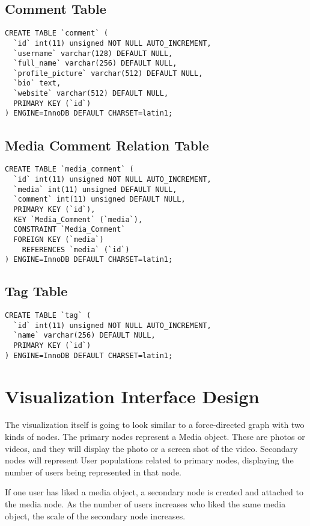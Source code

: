 \documentclass[journal]{vgtc}                %
\begin{document}
\subsection{Comment Table}
\begin{verbatim}
CREATE TABLE `comment` (
  `id` int(11) unsigned NOT NULL AUTO_INCREMENT,
  `username` varchar(128) DEFAULT NULL,
  `full_name` varchar(256) DEFAULT NULL,
  `profile_picture` varchar(512) DEFAULT NULL,
  `bio` text,
  `website` varchar(512) DEFAULT NULL,
  PRIMARY KEY (`id`)
) ENGINE=InnoDB DEFAULT CHARSET=latin1;
\end{verbatim}

\subsection{Media Comment Relation Table}
\begin{verbatim}
CREATE TABLE `media_comment` (
  `id` int(11) unsigned NOT NULL AUTO_INCREMENT,
  `media` int(11) unsigned DEFAULT NULL,
  `comment` int(11) unsigned DEFAULT NULL,
  PRIMARY KEY (`id`),
  KEY `Media_Comment` (`media`),
  CONSTRAINT `Media_Comment` 
  FOREIGN KEY (`media`) 
  	REFERENCES `media` (`id`)
) ENGINE=InnoDB DEFAULT CHARSET=latin1;
\end{verbatim}

\subsection{Tag Table}
\begin{verbatim}
CREATE TABLE `tag` (
  `id` int(11) unsigned NOT NULL AUTO_INCREMENT,
  `name` varchar(256) DEFAULT NULL,
  PRIMARY KEY (`id`)
) ENGINE=InnoDB DEFAULT CHARSET=latin1;
\end{verbatim}

\section{Visualization Interface Design}
The visualization itself is going to look similar to a force-directed graph with two kinds of nodes. The primary nodes represent a Media object. These are photos or videos, and they will display the photo or a screen shot of the video. Secondary nodes will represent User populations related to primary nodes, displaying the number of users being represented in that node.

If one user has liked a media object, a secondary node is created and attached to the media node. As the number of users increases who liked the same media object, the scale of the secondary node increases.
\end{document}
